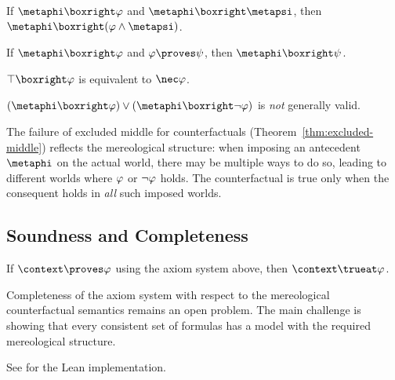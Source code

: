 \documentclass[../LogosReference.tex]{subfiles}
\begin{document}
\begin{theorem}\label{thm:cf-strengthening}
	If $\metaphi \boxright \metaA$ and $\metaphi \boxright \metapsi$, then $\metaphi \boxright (\metaA \land \metapsi)$.
\end{theorem}

\begin{theorem}\label{thm:cf-weakening}
	If $\metaphi \boxright \metaA$ and $\metaA \proves \metaB$, then $\metaphi \boxright \metaB$.
\end{theorem}

\begin{theorem}\label{thm:necessity-intro}
	$\top \boxright \metaA$ is equivalent to $\nec\metaA$.
\end{theorem}

\begin{theorem}\label{thm:excluded-middle}
	$(\metaphi \boxright \metaA) \lor (\metaphi \boxright \neg\metaA)$ is \emph{not} generally valid.
\end{theorem}

\begin{remark}
	The failure of excluded middle for counterfactuals (Theorem~\ref{thm:excluded-middle}) reflects the mereological structure: when imposing an antecedent $\metaphi$ on the actual world, there may be multiple ways to do so, leading to different worlds where $\varphi$ or $\neg\varphi$ holds.
	The counterfactual is true only when the consequent holds in \emph{all} such imposed worlds.
\end{remark}


\subsection{Soundness and Completeness}\label{sec:soundness-completeness}

\begin{theorem}[Soundness]\label{thm:soundness}
	If $\context \proves \metaA$ using the axiom system above, then $\context \trueat \metaA$.
\end{theorem}

\begin{question}
	Completeness of the axiom system with respect to the mereological counterfactual semantics remains an open problem.
	The main challenge is showing that every consistent set of formulas has a model with the required mereological structure.
\end{question}

See  for the Lean implementation.
\end{document}
